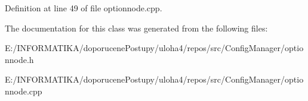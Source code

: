 Definition at line 49 of file optionnode.\+cpp.



The documentation for this class was generated from the following files\+:\begin{DoxyCompactItemize}
\item 
E\+:/\+I\+N\+F\+O\+R\+M\+A\+T\+I\+K\+A/doporucene\+Postupy/uloha4/repos/src/\+Config\+Manager/optionnode.\+h\item 
E\+:/\+I\+N\+F\+O\+R\+M\+A\+T\+I\+K\+A/doporucene\+Postupy/uloha4/repos/src/\+Config\+Manager/optionnode.\+cpp\end{DoxyCompactItemize}
